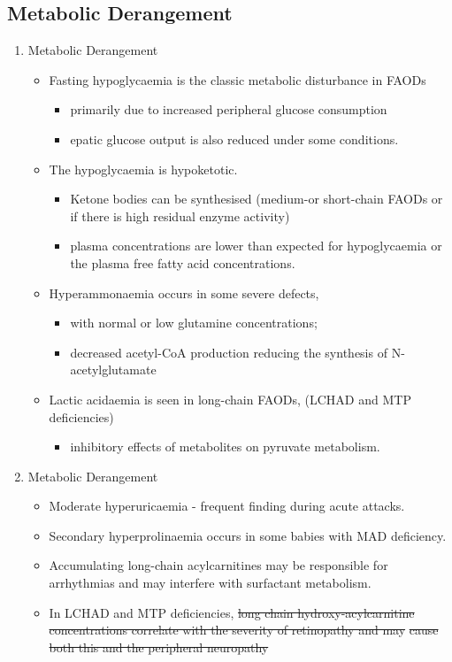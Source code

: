 \documentclass{scrartcl}
\begin{document}
\subsection{Metabolic Derangement}
\label{sec:orgc2a5b7a}
\begin{enumerate}
\item Metabolic Derangement
\label{sec:org857a7f1}
\begin{itemize}
\item Fasting hypoglycaemia is the classic metabolic disturbance in FAODs
\begin{itemize}
\item primarily due to increased peripheral glucose consumption
\item epatic glucose output is also reduced under some conditions.
\end{itemize}
\item The hypoglycaemia is hypoketotic.
\begin{itemize}
\item Ketone bodies can be synthesised (medium-or short-chain FAODs or if there is high residual enzyme activity)
\item plasma concentrations are lower than expected for hypoglycaemia or the plasma free fatty acid concentrations.
\end{itemize}
\item Hyperammonaemia occurs in some severe defects,
\begin{itemize}
\item with normal or low glutamine concentrations;
\item decreased acetyl-CoA production reducing the synthesis of N-acetylglutamate
\end{itemize}
\item Lactic acidaemia is seen in long-chain FAODs, (LCHAD and MTP deficiencies)
\begin{itemize}
\item inhibitory effects of metabolites on pyruvate metabolism.
\end{itemize}
\end{itemize}

\item Metabolic Derangement
\label{sec:orgb2c3281}
\begin{itemize}
\item Moderate hyperuricaemia - frequent finding during acute attacks.
\item Secondary hyperprolinaemia occurs in some babies with MAD deficiency.
\item Accumulating long-chain acylcarnitines may be responsible for
arrhythmias and may interfere with surfactant metabolism.
\item In LCHAD and MTP deficiencies, \sout{long chain hydroxy-acylcarnitine}
\sout{concentrations correlate with the severity of retinopathy and may}
\sout{cause both this and the peripheral neuropathy}
\end{itemize}
\end{enumerate}
\end{document}
